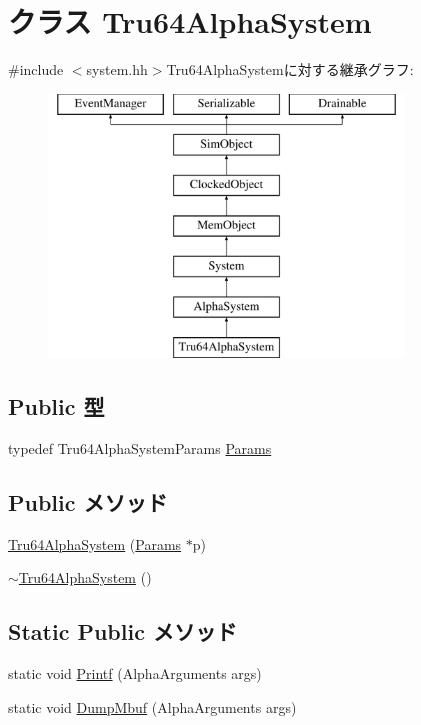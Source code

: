 \hypertarget{classTru64AlphaSystem}{
\section{クラス Tru64AlphaSystem}
\label{classTru64AlphaSystem}
}


{\ttfamily \#include $<$system.hh$>$}Tru64AlphaSystemに対する継承グラフ:\begin{figure}[H]
\begin{center}
\leavevmode
\includegraphics[height=7cm]{classTru64AlphaSystem}
\end{center}
\end{figure}
\subsection*{Public 型}
\begin{DoxyCompactItemize}
\item 
typedef Tru64AlphaSystemParams \hyperlink{classTru64AlphaSystem_a653e3d38e55079cc093cc4945c1ac3d1}{Params}
\end{DoxyCompactItemize}
\subsection*{Public メソッド}
\begin{DoxyCompactItemize}
\item 
\hyperlink{classTru64AlphaSystem_a5b0ae66b648ea464fceae312db22bb1a}{Tru64AlphaSystem} (\hyperlink{classTru64AlphaSystem_a653e3d38e55079cc093cc4945c1ac3d1}{Params} $\ast$p)
\item 
\hyperlink{classTru64AlphaSystem_af9fd4c006ca0b7da440766328643c6e8}{$\sim$Tru64AlphaSystem} ()
\end{DoxyCompactItemize}
\subsection*{Static Public メソッド}
\begin{DoxyCompactItemize}
\item 
static void \hyperlink{classTru64AlphaSystem_a7aab4d733bbaec993b9eab18250f028d}{Printf} (AlphaArguments args)
\item 
static void \hyperlink{classTru64AlphaSystem_a8728dd911bd0f85267192970b5141f67}{DumpMbuf} (AlphaArguments args)
\end{DoxyCompactItemize}
